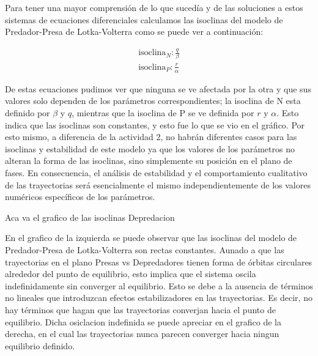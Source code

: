 \documentclass{article}
\begin{document}
\noindent Para tener una mayor comprensión de lo que sucedía y de las soluciones a estos sistemas de ecuaciones diferenciales calculamos las isoclinas del modelo de Predador-Presa de Lotka-Volterra como se puede ver a continuación:
\vspace{1\baselineskip}

\begin{align*}
\text{isoclina}_{N}: \frac{q}{\beta} \\
\text{isoclina}_{P}: \frac{r}{\alpha}
\end{align*}

\noindent De estas ecuaciones pudimos ver que ninguna se ve afectada por la otra y que sus valores solo dependen de los parámetros correspondientes; la isoclina de N esta definido por $\beta$ y $q$, mientras que la isoclina de P se ve definida por $r$ y $\alpha$. Esto indica que las isoclinas son constantes, y esto fue lo que se vio en el gráfico. Por esto mismo, a diferencia de la actividad 2, no habrán diferentes casos para las isoclinas y estabilidad de este modelo ya que los valores de los parámetros no alteran la forma de las isoclinas, sino simplemente su posición en el plano de fases. En consecuencia, el análisis de estabilidad y el comportamiento cualitativo de las trayectorias será esencialmente el mismo independientemente de los valores numéricos específicos de los parámetros.
\vspace{1\baselineskip}

\vspace{10\baselineskip}
\noindent Aca va el grafico de las isoclinas Depredacion
\vspace{10\baselineskip}


\vspace{1\baselineskip}

\noindent En el grafico de la izquierda se puede observar que las isoclinas del modelo de Predador-Presa de Lotka-Volterra son rectas constantes. Aunado a que las trayectorias en el plano Presas vs Depredadores tienen forma de órbitas circulares alrededor del punto de equilibrio, esto implica que el sistema oscila indefinidamente sin converger al equilibrio. Esto se debe a la ausencia de términos no lineales que introduzcan efectos estabilizadores en las trayectorias. Es decir, no hay términos que hagan que las trayectorias converjan hacia el punto de equilibrio. Dicha osiclacion indefinida se puede apreciar en el grafico de la derecha, en el cual las trayectorias nunca parecen converger hacia ningun equilibrio definido.
\vspace{1\baselineskip}
\end{document}
